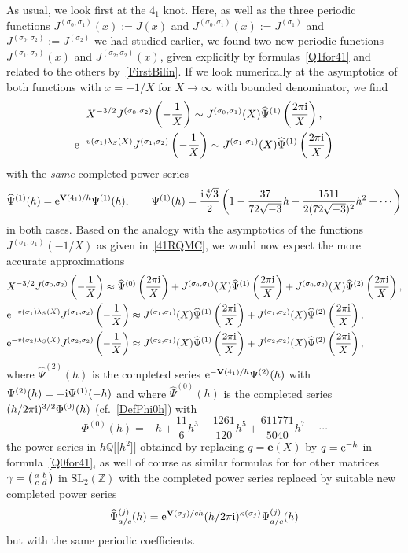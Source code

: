 \documentclass[pdftex]{sigma}
\numberwithin{equation}{section}
\def\l{\lambda}
\def\k{\kappa}
\def\SL{\mathrm{SL}}
\def\Psih{\widehat\Psi}
\def\Psih{\widehat\Psi}
\def\e{\mathbf{e}}
\def\l{\lambda}
\def\Z{\mathbb Z}
\def\Q{\mathbb Q}
\def\m{ - }
\def\e{\mathbf{e}}
\def\l{\lambda}
\def\s{\sigma}
\def\sma#1#2#3#4{\bigl(\smallmatrix#1&#2\\#3&#4\endsmallmatrix\bigr)} %
\def\J{\mathbf J} \def\J{J} %
\def\V{\mathbf V}
\def\tV{v} %
\def\g{\gamma}
\begin{document}
As usual, we look first at the $4_1$ knot. Here, as well as the three periodic functions
$\J^{(\s_0,\s_1)}(x)\allowbreak:=\J(x)$ and $\J^{(\s_0,\s_1)}(x) := \J^{(\s_1)}$ and
$\J^{(\s_0,\s_2)}:=\J^{(\s_2)}$ we had studied earlier, we found two new periodic functions
$\J^{(\s_1,\s_2)}(x)$ and $\J^{(\s_2,\s_2)}(x)$, given explicitly by
formulas~\eqref{Q1for41} and related to the others by~\eqref{FirstBilin}. If we look
numerically at the asymptotics
of both functions with $x=-1/X$ for $X\to\infty$ with bounded denominator, we find
\begin{gather*}
X^{-3/2}\J^{(\s_0,\s_2)}\left(-\frac1X\right)  \sim  \J^{(\s_0,\s_1)}(X)
\Psih^{(1)}\left(\frac{2\pi {\rm i}}{X}\right) , \\
{\rm e}^{-\tV(\s_1)\l_S(X)}  \J^{(\s_1,\s_2)}\left(-\frac1X\right)  \sim
\J^{(\s_1,\s_1)}(X) \Psih^{(1)}\left(\frac{2\pi {\rm i}}{X}\right)
\end{gather*}
with the \emph{same} completed power series
\[
\Psih^{(1)}(h) = {\rm e}^{\V(4_1)/h} \Psi^{(1)}(h),\qquad
\Psi^{(1)}(h)= \frac{{\rm i} \sqrt[4]3}{2}
\left(1 \m \frac{37}{72\sqrt{-3}} h \m \frac{1511}{2(72\sqrt{-3})^2} h^2+\cdots\right)
\]
in both cases. Based on the analogy with the asymptotics of the functions
$\J^{(\s_1,\s_1)}(-1/X)$ as given in~\eqref{41RQMC}, we would now expect
the more accurate
approximations
\begin{align}
 & X^{-3/2}\J^{(\s_0,\s_2)}\left(-\frac{1}{X}\right) \approx \Psih^{(0)}\left(\frac{2\pi {\rm i}}{X}\right) +
 \J^{(\s_0,\s_1)}(X) \Psih^{(1)}\left(\frac{2\pi {\rm i}}{X}\right)
 + \J^{(\s_0,\s_2)}(X) \Psih^{(2)}\left(\frac{2\pi {\rm i}}{X}\right) ,
 \nonumber\\
 & {\rm e}^{-\tV(\s_1) \l_S(X)} \J^{(\s_1,\s_2)}\left(-\frac{1}{X}\right) \approx
 \J^{(\s_1,\s_1)}(X) \Psih^{(1)}\left(\frac{2\pi {\rm i}}{X}\right) +\J^{(\s_1,\s_2)}(X) \Psih^{(2)}\left(\frac{2\pi {\rm i}}{X}\right) ,\nonumber
 \\
 & {\rm e}^{-\tV(\s_2) \l_S(X)} \J^{(\s_2,\s_2)}\left(-\frac{1}{X}\right) \approx
 \J^{(\s_2,\s_1)}(X) \Psih^{(1)}\left(\frac{2\pi {\rm i}}{X}\right) +\J^{(\s_2,\s_2)}(X) \Psih^{(2)}\left(\frac{2\pi {\rm i}}{X}\right) ,
 \label{FirstMatrix}
\end{align}
where $\Psih^{(2)}(h)$ is the completed series ${\rm e}^{-\V(4_1)/h} \Psi^{(2)}(h)$ with
$\Psi^{(2)}(h)=-{\rm i}\Psi^{(1)}(-h)$ and where $\Psih^{(0)}(h)$ is the completed series
$(h/2\pi {\rm i})^{3/2} \Phi^{(0)}(h)$ (cf.\ \eqref{DefPhi0h}) with
\[
\Phi^{(0)}(h) = -h + \frac{11}6 h^3 \m \frac{1261}{120} h^5
+ \frac{611771}{5040} h^7 \m \cdots
\]
the power series in $h \Q\big[\big[h^2\big]\big]$ obtained by replacing $q=\e(X)$ by $q={\rm e}^{-h}$
in formula~\eqref{Q0for41}, as well of course as similar formulas for
\smash{$\J^{(\s,\s')}(\g X)$} for other matrices $\g=\sma abcd$ in $\SL_2(\Z)$ with the
completed power series \smash{$\Psih^{(j)}(h)$} replaced by suitable new completed power
series
\[\Psih_{a/c}^{(j)}(h)={\rm e}^{\V(\s_j)/ch}(h/2\pi {\rm i})^{\k(\s_j)}\Psi_{a/c}^{(j)}(h)
\]
but with the same periodic coefficients.
\end{document}
